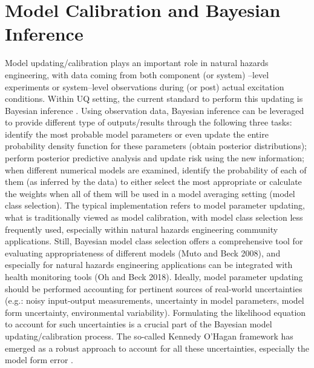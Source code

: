 \section{Model Calibration and Bayesian Inference}
\label{sec:uq_calibration}

Model updating/calibration plays an important role in natural hazards engineering, with data coming from both component (or system) –level experiments or system–level observations during (or post) actual excitation conditions. Within UQ setting, the current standard to perform this updating is Bayesian inference \citep{beck2010bayesian,kontoroupi2017online}. Using observation data, Bayesian inference can be leveraged to provide different type of outputs/results \citep{beck2013prior} through the following three tasks: identify the most probable model parameters or even update the entire probability density function for these parameters (obtain posterior distributions); perform posterior predictive analysis and update risk using the new information; when different numerical models are examined, identify the probability of each of them (as inferred by the data) to either select the most appropriate or calculate the weights when all of them will be used in a model averaging setting (model class selection). The typical implementation refers to model parameter updating, what is traditionally viewed as model calibration, with model class selection less frequently used, especially within natural hazards engineering community applications. Still, Bayesian model class selection offers a comprehensive tool for evaluating appropriateness of different models (Muto and Beck 2008), and especially for natural hazards engineering applications can be integrated with health monitoring tools (Oh and Beck 2018). Ideally, model parameter updating should be performed accounting for pertinent sources of real-world uncertainties (e.g.: noisy input-output measurements, uncertainty in model parameters, model form uncertainty, environmental variability). Formulating the likelihood equation to account for such uncertainties is a crucial part of the Bayesian model updating/calibration process. The so-called Kennedy O’Hagan framework has emerged as a robust approach to account for all these uncertainties, especially the model form error \citep{kennedy2001bayesian}. 


